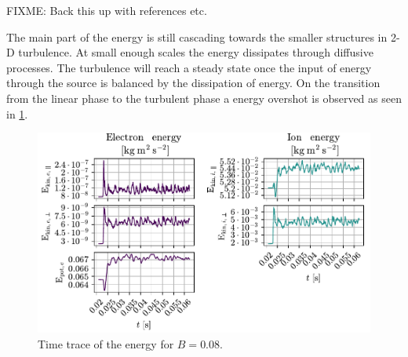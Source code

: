 FIXME: Back this up with references etc.

The main part of the energy is still cascading towards the smaller structures in 2-D turbulence.
At small enough scales the energy dissipates through diffusive processes.
The turbulence will reach a steady state once the input of energy through the source is balanced by the dissipation of energy.
On the transition from the linear phase to the turbulent phase a energy overshot is observed as seen in \cref{fig:energyTrace008}.
%
\begin{figure}[htb]
    \centering
    \includegraphics[width=1.0\textwidth]{fig/results/energyTrace/energyTraceB008}
    \caption{Time trace of the energy for $B=0.08$.}
    \label{fig:energyTrace008}
\end{figure}

